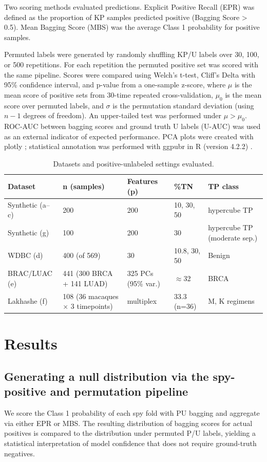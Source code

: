 \documentclass[11pt]{article}
\begin{document}
Two scoring methods evaluated predictions. Explicit Positive Recall (EPR) \cite{cheng2017pu} was defined as the proportion of KP samples predicted positive (Bagging Score > 0.5). Mean Bagging Score (MBS) was the average Class 1 probability for positive samples.

Permuted labels were generated by randomly shuffling KP/U labels over 30, 100, or 500 repetitions. For each repetition the permuted positive set was scored with the same pipeline. Scores were compared using Welch's t-test, Cliff's Delta with 95\% confidence interval, and p-value from a one-sample z-score, where $\mu$ is the mean score of positive sets from 30-time repeated cross-validation, $\mu_0$ is the mean score over permuted labels, and $\sigma$ is the permutation standard deviation (using $n-1$ degrees of freedom). An upper-tailed test was performed under $\mu > \mu_0$. ROC-AUC between bagging scores and ground truth U labels (U-AUC) was used as an external indicator of expected performance. PCA plots were created with plotly \cite{plotly}; statistical annotation was performed with ggpubr in R (version 4.2.2) \cite{kassambara2020ggpubr}.

\begin{table}[h]
\centering
\caption{Datasets and positive-unlabeled settings evaluated.}
\begin{tabular}{lllll}
\toprule
Dataset & n (samples) & Features (p) & \%TN & TP class \\
\midrule
Synthetic (a--c) & 200 & 200 & 10, 30, 50 & hypercube TP \\
Synthetic (g) & 100 & 200 & 30 & hypercube TP (moderate sep.) \\
WDBC (d) & 400 (of 569) & 30 & 10.8, 30, 50 & Benign \\
BRAC/LUAC (e) & 441 (300 BRCA + 141 LUAD) & 325 PCs (95\% var.) & $\approx$32 & BRCA \\
Lakhashe (f) & 108 (36 macaques $\times$ 3 timepoints) & multiplex & 33.3 (n=36) & M, K regimens \\
\bottomrule
\end{tabular}
\end{table}

\section{Results}
\subsection{Generating a null distribution via the spy-positive and permutation pipeline}
We score the Class 1 probability of each spy fold with PU bagging and aggregate via either EPR or MBS. The resulting distribution of bagging scores for actual positives is compared to the distribution under permuted P/U labels, yielding a statistical interpretation of model confidence that does not require ground-truth negatives.
\end{document}
